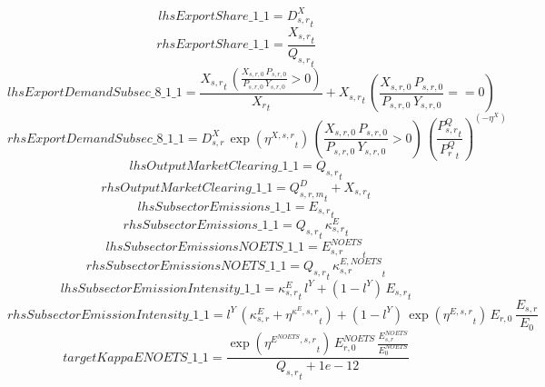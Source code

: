 \begin{dmath*}
lhsExportShare\_1\_1 = {{D^{X}_{s,r}}}_{t}
\end{dmath*}
\begin{dmath*}
rhsExportShare\_1\_1 = \frac{{{X_{s,r}}}_{t}}{{{Q_{s,r}}}_{t}}
\end{dmath*}
\begin{dmath*}
lhsExportDemandSubsec\_8\_1\_1 = \frac{{{X_{s,r}}}_{t}\, \left({\frac{X_{s,r,0} \, P_{s,r,0}}{P_{s,r,0} \, Y_{s,r,0}}}>0\right)}{{{X_r}}_{t}}+{{X_{s,r}}}_{t}\, \left({\frac{X_{s,r,0} \, P_{s,r,0}}{P_{s,r,0} \, Y_{s,r,0}}}==0\right)
\end{dmath*}
\begin{dmath*}
rhsExportDemandSubsec\_8\_1\_1 = {{D^{X}_{s,r}}}\, \exp\left({{\eta^{X,s,r}}}_{t}\right)\, \left({\frac{X_{s,r,0} \, P_{s,r,0}}{P_{s,r,0} \, Y_{s,r,0}}}>0\right)\, \left(\frac{{{P^Q_{s,r}}}_{t}}{{{P^Q_{r}}}_{t}}\right)^{\left(-{{\eta^{X}}}\right)}
\end{dmath*}
\begin{dmath*}
lhsOutputMarketClearing\_1\_1 = {{Q_{s,r}}}_{t}
\end{dmath*}
\begin{dmath*}
rhsOutputMarketClearing\_1\_1 = {{Q^D_{s,r,m}}}_{t}+{{X_{s,r}}}_{t}
\end{dmath*}
\begin{dmath*}
lhsSubsectorEmissions\_1\_1 = {{E_{s,r}}}_{t}
\end{dmath*}
\begin{dmath*}
rhsSubsectorEmissions\_1\_1 = {{Q_{s,r}}}_{t}\, {{\kappa^{E}_{s,r}}}_{t}
\end{dmath*}
\begin{dmath*}
lhsSubsectorEmissionsNOETS\_1\_1 = {{E^{NOETS}_{s,r}}}_{t}
\end{dmath*}
\begin{dmath*}
rhsSubsectorEmissionsNOETS\_1\_1 = {{Q_{s,r}}}_{t}\, {{\kappa^{E,NOETS}_{s,r}}}_{t}
\end{dmath*}
\begin{dmath*}
lhsSubsectorEmissionIntensity\_1\_1 = {{\kappa^{E}_{s,r}}}_{t}\, {{l^{Y}}}+\left(1-{{l^{Y}}}\right)\, {{E_{s,r}}}_{t}
\end{dmath*}
\begin{dmath*}
rhsSubsectorEmissionIntensity\_1\_1 = {{l^{Y}}}\, \left({{\kappa^{E}_{s,r}}}+{{\eta^{\kappa^{E},s,r}}}_{t}\right)+\left(1-{{l^{Y}}}\right)\, \exp\left({{\eta^{E,s,r}}}_{t}\right)\, {{E_{r,0}}}\, {{\frac{E_{s,r}}{E_0}}}
\end{dmath*}
\begin{dmath*}
targetKappaENOETS\_1\_1 = \frac{\exp\left({{\eta^{E^{NOETS},s,r}}}_{t}\right)\, {{E^{NOETS}_{r,0}}}\, {{\frac{E^{NOETS}_{s,r}}{E^{NOETS}_0}}}}{{{Q_{s,r}}}_{t}+1e-12}
\end{dmath*}
